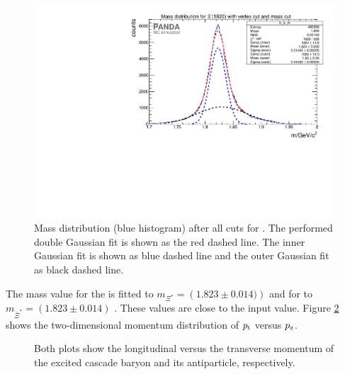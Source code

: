 	\begin{figure}
		\centering
		\includegraphics[width=1.\textwidth]{./plots/Xi1820/XiMinus1820_m_masscut.pdf}
		\caption{\propose Mass distribution (blue histogram) after all cuts for \excitedcascade. The performed double Gaussian fit is shown as the red dashed line.
		The inner Gaussian fit is shown as blue dashed line and the outer Gaussian fit as black dashed line.}
		\label{fig:xi1820_massfit}
	\end{figure}
	The mass value for the \excitedcascade is fitted to $m_{\Xi^{*}} = \left(1.823 \pm 0.014)\right)$ \massunit
	 and for \excitedanticascade to $m_{\bar{\Xi}^{*}} = \left(1.823 \pm 0.014\right)$ \massunit.
	These values are close to the input value.
	Figure \ref{fig:xi1820_pt_vs_pz} shows the two-dimensional momentum distribution of $p_{\textnormal{t}}$ versus $p_{\textnormal{z}}$.
	
	\begin{figure}
		\centering
		\caption{\propose Both plots show the longitudinal versus the transverse momentum of the excited cascade baryon and its antiparticle, respectively.}
		\label{fig:xi1820_pt_vs_pz}
	\end{figure}
	
